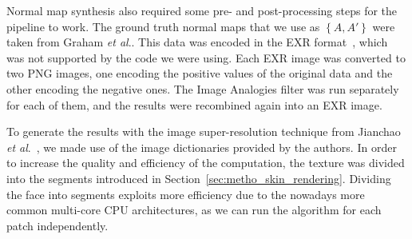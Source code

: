 Normal map synthesis also required some pre- and post-processing steps for the pipeline to work.
The ground truth normal maps that we use as $\left\lbrace A, A' \right\rbrace$ were taken from Graham \textit{et al}.\cite{Graham2013}.
This data was encoded in the EXR format~\cite{EXRWeb}, which was not supported by the code we were using.
Each EXR image was converted to two PNG images, one encoding the positive values of the original data and the other encoding the negative ones.
The Image Analogies filter was run separately for each of them, and the results were recombined again into an EXR image.

To generate the results with the image super-resolution technique from Jianchao \textit{et al}.~\cite{Jianchao2010}, we made use of the image dictionaries provided by the authors.
In order to increase the quality and efficiency of the computation, the texture was divided into the segments introduced in Section~\ref{sec:metho_skin_rendering}.
Dividing the face into segments exploits more efficiency due to the nowadays more common multi-core CPU architectures, as we can run the algorithm for each patch independently.

